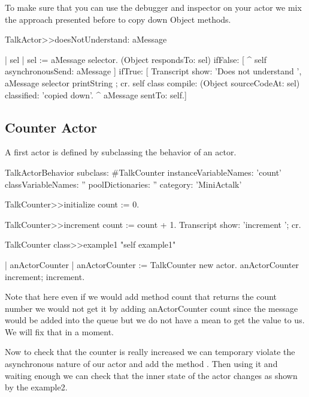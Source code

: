 \documentclass[a4paper,10pt,twoside]{book}
\begin{document}
To make sure that you can use the debugger and inspector on your actor we mix the approach 
presented before to copy down Object methods. 

\begin{method}{}
TalkActor>>doesNotUnderstand: aMessage

	| sel |
	sel := aMessage selector. 
	(Object respondsTo: sel)
		ifFalse: [ ^ self asynchronousSend: aMessage ] 
		ifTrue: [	
				Transcript show: 'Does not understand ',  aMessage selector printString ; cr.
				self class compile: (Object sourceCodeAt: sel) classified: 'copied down'.
				^ aMessage sentTo: self.]
\end{method}


\subsection{Counter Actor}
A first actor is defined by subclassing the behavior of an actor.

\begin{classdef}{}
TalkActorBehavior subclass: #TalkCounter
	instanceVariableNames: 'count'
	classVariableNames: ''
	poolDictionaries: ''
	category: 'MiniActalk'
\end{classdef}

\begin{method}{}
TalkCounter>>initialize
	count := 0.

TalkCounter>>increment
	count := count + 1.
	Transcript show: 'increment '; cr.
\end{method}
	
	
\begin{method}{}
TalkCounter class>>example1
	"self example1"

	| anActorCounter |
	anActorCounter := TalkCounter new actor.
	anActorCounter increment; increment.	
\end{method}



Note that here even if we would add method count that returns the count number
we would not get it by adding anActorCounter count since the message would be added into the queue
but we do not have a mean to get the value to us. We will fix that in a moment.

Now to check that the counter is really increased we can temporary violate the asynchronous
nature of our actor and add the method . Then using it and waiting enough we can check that the 
inner state of the actor changes as shown by the example2. 
\end{document}
